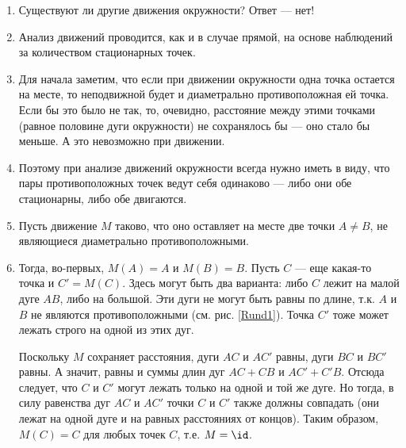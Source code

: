 \begin{enumerate}


\item Существуют ли другие движения окружности? Ответ --- нет!
\item Анализ движений проводится, как и в случае прямой, на основе наблюдений за количеством стационарных точек.
\item Для начала заметим, что если при движении окружности одна точка остается на месте, то неподвижной будет и диаметрально противоположная ей точка. Если бы это было не так, то, очевидно, расстояние между этими точками (равное половине дуги окружности) не сохранялось бы --- оно стало бы меньше. А это невозможно при движении.
\item Поэтому при анализе движений окружности всегда нужно иметь в виду, что пары противоположных точек ведут себя одинаково --- либо они обе стационарны, либо обе двигаются.
\item Пусть движение $M$ таково, что оно оставляет на месте две точки $A\ne B$, не являющиеся диаметрально противоположными.
\item Тогда, во-первых, $M(A)=A$ и $M(B)=B$. Пусть $C$ --- еще какая-то точка и $C'=M(C)$. Здесь могут быть два варианта: либо $C$ лежит на малой дуге $AB$, либо на большой. Эти дуги не могут быть равны по длине, т.к. $A$ и $B$ не являются противоположными (см. рис. \ref{Rund1}). Точка $C'$ тоже может лежать строго на одной из этих дуг.

Поскольку $M$ сохраняет расстояния, дуги $AC$ и $AC'$ равны, дуги $BC$ и $BC'$ равны. А значит, равны и суммы длин дуг $AC+CB$ и $AC'+C'B$. Отсюда следует, что $C$ и $C'$ могут лежать только на одной и той же дуге. Но тогда, в силу равенства дуг $AC$ и $AC'$ точки $C$ и $C'$ также должны совпадать (они лежат на одной дуге и на равных расстояниях от концов). Таким образом, $M(C)=C$ для любых точек $C$, т.е. $M=\id$.


\end{enumerate}
